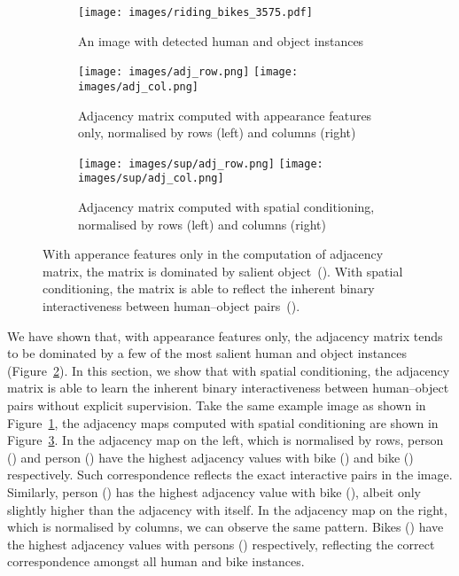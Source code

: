 \documentclass[10pt,twocolumn,letterpaper]{article}
\begin{document}
\begin{figure}[h!]\centering
	\begin{subfigure}[t]{\linewidth}
	   \centering
		\texttt{[image: images/riding\_bikes\_3575.pdf]}
	   \caption{An image with detected human and object instances}
	   \label{fig:sup_riding_bikes}
	\end{subfigure}

	\begin{subfigure}[t]{\linewidth}
		\centering
		 \texttt{[image: images/adj\_row.png]}
		\texttt{[image: images/adj\_col.png]}
		\caption{Adjacency matrix computed with appearance features only, normalised by rows (left) and columns (right)}
		\label{fig:sup_adj_baseline}
	 \end{subfigure}
	
	\begin{subfigure}[t]{\linewidth}
	   \centering
		\texttt{[image: images/sup/adj\_row.png]}
	   \texttt{[image: images/sup/adj\_col.png]}
	   \caption{Adjacency matrix computed with spatial conditioning, normalised by rows (left) and columns (right)}
	   \label{fig:sup_adj}
	\end{subfigure}
	\newline
	\caption{With apperance features only in the computation of adjacency matrix, the matrix is dominated by salient object~(). With spatial conditioning, the matrix is able to reflect the inherent binary interactiveness between human--object pairs~().}
	\label{fig:sc_adj}
 \end{figure}

We have shown that, with appearance features only, the adjacency matrix tends to be dominated by a few of the most salient human and object instances (Figure~\ref{fig:sup_adj_baseline}). In this section, we show that with spatial conditioning, the adjacency matrix is able to learn the inherent binary interactiveness between human--object pairs without explicit supervision. Take the same example image as shown in Figure~\ref{fig:sup_riding_bikes}, the adjacency maps computed with spatial conditioning are shown in Figure~\ref{fig:sup_adj}. In the adjacency map on the left, which is normalised by rows, person () and person () have the highest adjacency values with bike () and bike () respectively. Such correspondence reflects the exact interactive pairs in the image. Similarly, person () has the highest adjacency value with bike (), albeit only slightly higher than the adjacency with itself. In the adjacency map on the right, which is normalised by columns, we can observe the same pattern. Bikes () have the highest adjacency values with persons () respectively, reflecting the correct correspondence amongst all human and bike instances.
\end{document}
